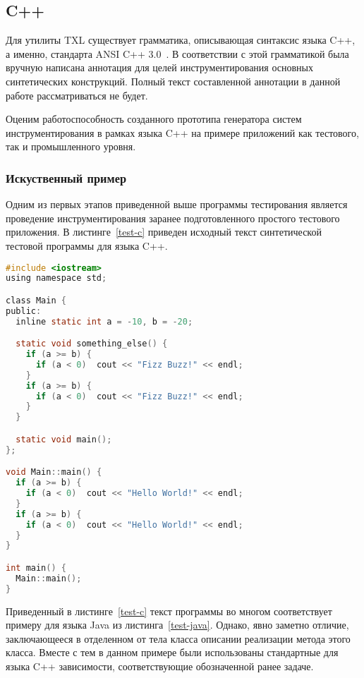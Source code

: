 \subsection{C++}

Для утилиты TXL существует грамматика, описывающая синтаксис языка C++, а именно, стандарта ANSI C++ 3.0~\cite{txl-resources}.
В соответствии с этой грамматикой была вручную написана аннотация для целей инструментирования основных синтетических конструкций.
Полный текст составленной аннотации в данной работе рассматриваться не будет.

Оценим работоспособность созданного прототипа генератора систем инструментирования в рамках языка C++ на примере приложений как тестового, так и промышленного уровня.

\subsubsection{Искуственный пример}

Одним из первых этапов приведенной выше программы тестирования является проведение инструментирования заранее подготовленного простого тестового приложения.
В листинге~\ref{test-c} приведен исходный текст синтетической тестовой программы для языка C++.

\begin{lstlisting}[frame=single, language=C, label={test-c}, caption={Исходный текст тестового приложения.}]
#include <iostream>
using namespace std;

class Main {
public:
  inline static int a = -10, b = -20;

  static void something_else() {
    if (a >= b) {
      if (a < 0)  cout << "Fizz Buzz!" << endl;
    }
    if (a >= b) {
      if (a < 0)  cout << "Fizz Buzz!" << endl;
    }
  }

  static void main();
};

void Main::main() {
  if (a >= b) {
    if (a < 0)  cout << "Hello World!" << endl;
  }
  if (a >= b) {
    if (a < 0)  cout << "Hello World!" << endl;
  }
}

int main() {
  Main::main();
}
\end{lstlisting}

Приведенный в листинге~\ref{test-c} текст программы во многом соответствует примеру для языка Java из листинга~\ref{test-java}.
Однако, явно заметно отличие, заключающееся в отделенном от тела класса описании реализации метода этого класса.
Вместе с тем в данном примере были использованы стандартные для языка C++ зависимости, соответствующие обозначенной ранее задаче.

